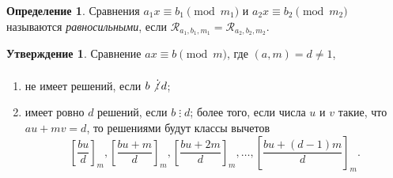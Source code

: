 \documentclass[14pt, a4paper]{extarticle}
\theoremstyle{definition}
\newtheorem*{definition}{Определение}
\newtheorem{statement}{Утверждение}
\newcommand{\divisible}{\mathop{\vdots}}
\begin{document}
	\begin{definition}
		Сравнения $a_1x\equiv b_1\pmod{m_1}$ и $a_2x\equiv b_2\pmod{m_2}$ называются \emph{равносильными}, если $\mathcal{R}_{a_1,b_1,m_1}=\mathcal{R}_{a_2,b_2,m_2}$.
	\end{definition}

	\begin{statement}
		Сравнение $ax\equiv b\pmod{m}$, где $(a,m)=d\neq1$,
		\begin{enumerate}[topsep=0pt,itemsep=-1ex,partopsep=1ex,parsep=1ex]
			\item не имеет решений, если $b\not\divisible d$;
			\item имеет ровно $d$ решений, если $b\divisible d$; более того, если числа $u$ и $v$ такие, что $au+mv=d$, то решениями будут классы вычетов $$\left[\frac{bu}{d}\right]_m, \left[\frac{bu+m}{d}\right]_m, \left[\frac{bu+2m}{d}\right]_m, \dots, \left[\frac{bu+(d-1)m}{d}\right]_m.$$
		\end{enumerate}
	\end{statement}
\end{document}
